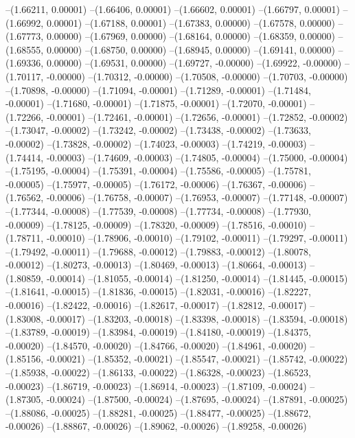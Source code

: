 --(1.66211, 0.00001)
--(1.66406, 0.00001)
--(1.66602, 0.00001)
--(1.66797, 0.00001)
--(1.66992, 0.00001)
--(1.67188, 0.00001)
--(1.67383, 0.00000)
--(1.67578, 0.00000)
--(1.67773, 0.00000)
--(1.67969, 0.00000)
--(1.68164, 0.00000)
--(1.68359, 0.00000)
--(1.68555, 0.00000)
--(1.68750, 0.00000)
--(1.68945, 0.00000)
--(1.69141, 0.00000)
--(1.69336, 0.00000)
--(1.69531, 0.00000)
--(1.69727, -0.00000)
--(1.69922, -0.00000)
--(1.70117, -0.00000)
--(1.70312, -0.00000)
--(1.70508, -0.00000)
--(1.70703, -0.00000)
--(1.70898, -0.00000)
--(1.71094, -0.00001)
--(1.71289, -0.00001)
--(1.71484, -0.00001)
--(1.71680, -0.00001)
--(1.71875, -0.00001)
--(1.72070, -0.00001)
--(1.72266, -0.00001)
--(1.72461, -0.00001)
--(1.72656, -0.00001)
--(1.72852, -0.00002)
--(1.73047, -0.00002)
--(1.73242, -0.00002)
--(1.73438, -0.00002)
--(1.73633, -0.00002)
--(1.73828, -0.00002)
--(1.74023, -0.00003)
--(1.74219, -0.00003)
--(1.74414, -0.00003)
--(1.74609, -0.00003)
--(1.74805, -0.00004)
--(1.75000, -0.00004)
--(1.75195, -0.00004)
--(1.75391, -0.00004)
--(1.75586, -0.00005)
--(1.75781, -0.00005)
--(1.75977, -0.00005)
--(1.76172, -0.00006)
--(1.76367, -0.00006)
--(1.76562, -0.00006)
--(1.76758, -0.00007)
--(1.76953, -0.00007)
--(1.77148, -0.00007)
--(1.77344, -0.00008)
--(1.77539, -0.00008)
--(1.77734, -0.00008)
--(1.77930, -0.00009)
--(1.78125, -0.00009)
--(1.78320, -0.00009)
--(1.78516, -0.00010)
--(1.78711, -0.00010)
--(1.78906, -0.00010)
--(1.79102, -0.00011)
--(1.79297, -0.00011)
--(1.79492, -0.00011)
--(1.79688, -0.00012)
--(1.79883, -0.00012)
--(1.80078, -0.00012)
--(1.80273, -0.00013)
--(1.80469, -0.00013)
--(1.80664, -0.00013)
--(1.80859, -0.00014)
--(1.81055, -0.00014)
--(1.81250, -0.00014)
--(1.81445, -0.00015)
--(1.81641, -0.00015)
--(1.81836, -0.00015)
--(1.82031, -0.00016)
--(1.82227, -0.00016)
--(1.82422, -0.00016)
--(1.82617, -0.00017)
--(1.82812, -0.00017)
--(1.83008, -0.00017)
--(1.83203, -0.00018)
--(1.83398, -0.00018)
--(1.83594, -0.00018)
--(1.83789, -0.00019)
--(1.83984, -0.00019)
--(1.84180, -0.00019)
--(1.84375, -0.00020)
--(1.84570, -0.00020)
--(1.84766, -0.00020)
--(1.84961, -0.00020)
--(1.85156, -0.00021)
--(1.85352, -0.00021)
--(1.85547, -0.00021)
--(1.85742, -0.00022)
--(1.85938, -0.00022)
--(1.86133, -0.00022)
--(1.86328, -0.00023)
--(1.86523, -0.00023)
--(1.86719, -0.00023)
--(1.86914, -0.00023)
--(1.87109, -0.00024)
--(1.87305, -0.00024)
--(1.87500, -0.00024)
--(1.87695, -0.00024)
--(1.87891, -0.00025)
--(1.88086, -0.00025)
--(1.88281, -0.00025)
--(1.88477, -0.00025)
--(1.88672, -0.00026)
--(1.88867, -0.00026)
--(1.89062, -0.00026)
--(1.89258, -0.00026)
